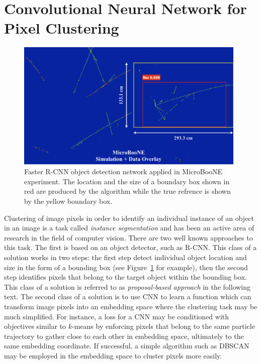 \documentclass{ws-rv9x6}
\begin{document}
\section{Convolutional Neural Network for Pixel Clustering}
\begin{figure}[t]
    \centering
    \includegraphics[width=0.98\textwidth]{figures/uboone_detection.pdf}
    \caption{Faster R-CNN object detection network applied in MicroBooNE experiment. The location and the size of a boundary box shown in red are produced by the algorithm while the true refrence is shown by the yellow boundary box. }
    \label{fig:clustering:uboone_detection}
\end{figure}
Clustering of image pixels in order to identify an individual instance of an object in an image is a task called {\it instance segmentation} and has been an active area of research in the field of computer vision.  There are two well known approaches to this task. The first is based on an object detector, such as R-CNN. 
This class of a solution works in two steps: the first step detect individual object location and size in the form of a bounding box (see Figure~\ref{fig:clustering:uboone_detection} for example), then the second step identifies pixels that belong to the target object within the bounding box. This class of a solution is referred to as {\it proposal-based approach} in the following text. The second class of a solution is to use CNN to learn a function which can transform image pixels into an embedding space where the clustering task may be much simplified. For instance, a loss for a CNN may be conditioned with objectives similar to $k$-means by enforcing pixels that belong to the same particle trajectory to gather close to each other in embedding space, ultimately to the same embedding coordinate. If successful, a simple algorithm such as DBSCAN may be employed in the embedding space to cluster pixels more easily.
\end{document}
